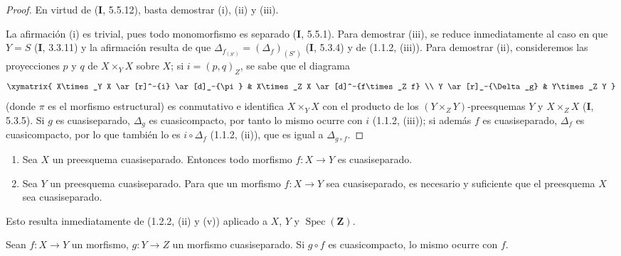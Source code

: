 \begin{proof}
En virtud de (\textbf{I}, 5.5.12), basta demostrar (i), (ii) y (iii).

La afirmación (i) es trivial, pues todo monomorfismo es separado (\textbf{I}, 5.5.1).
Para demostrar (iii), se reduce inmediatamente al caso en que $Y=S$ (\textbf{I}, 3.3.11) y
la afirmación resulta de que
$\Delta_{f_{(S')}}=(\Delta_f)_{(S')}$ (\textbf{I}, 5.3.4) y de (1.1.2, (iii)). Para
demostrar (ii), consideremos las proyecciones $p$ y $q$ de $X\times_Y X$ sobre
$X$; si $i=(p,q)_Z$, se sabe que el diagrama
\[
\xymatrix{
  X\times_Y X \ar[r]^-{i} \ar[d]_-{\pi} & X\times_Z X
    \ar[d]^-{f\times_Z f} \\
  Y \ar[r]_-{\Delta_g} & Y\times_Z Y
}
\]
(donde $\pi$ es el morfismo estructural) es conmutativo e identifica
$X\times_Y X$ con el producto de los $(Y\times_Z Y)$-preesquemas $Y$ y
$X\times_Z X$ (\textbf{I}, 5.3.5). Si $g$ es cuasiseparado, $\Delta_g$ es
cuasicompacto,
por tanto lo mismo ocurre con $i$ (1.1.2, (iii)); si además $f$
es cuasiseparado, $\Delta_f$ es cuasicompacto, por lo que también lo es
$i\circ\Delta_f$ (1.1.2, (ii)), que es igual a $\Delta_{g\circ f}$.
\end{proof}

\begin{corollary}[1.2.3]
\label{IV.1.2.3-fr}
\begin{enumerate}
  \item[\textup{(i)}] Sea $X$ un preesquema cuasiseparado. Entonces todo morfismo $f:X\to Y$
  es cuasiseparado.
  \item[\textup{(ii)}] Sea $Y$ un preesquema cuasiseparado. Para que un morfismo $f:X\to Y$
  sea cuasiseparado, es necesario y suficiente que el preesquema $X$ sea
  cuasiseparado.
\end{enumerate}
\end{corollary}

Esto resulta inmediatamente de (1.2.2, (ii) y (v)) aplicado a $X$, $Y$ y
$\operatorname{Spec}(\mathbf Z)$.

\begin{proposition}[1.2.4]
\label{IV.1.2.4-fr}
Sean $f:X\to Y$ un morfismo, $g:Y\to Z$ un morfismo cuasiseparado. Si
$g\circ f$ es cuasicompacto, lo mismo ocurre con $f$.
\end{proposition}

